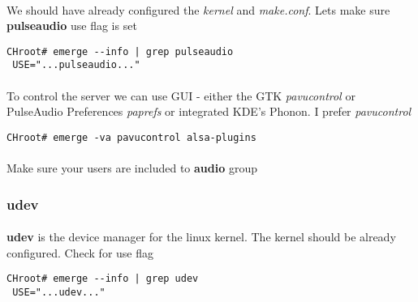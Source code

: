 \documentclass[10pt,a4paper]{article}
\begin{document}
                    \paragraph{} We should have already configured the \textit{kernel} and \textit{make.conf}. Lets make sure \textbf{pulseaudio} use flag is set
                    
                    \begin{lstlisting}[style=BashInputCHRoot]
 CHroot# emerge --info | grep pulseaudio
 USE="...pulseaudio..."
                    \end{lstlisting}
                    
                    \paragraph{} To control the server we can use GUI - either the GTK \textit{pavucontrol} or PulseAudio Preferences \textit{paprefs} or integrated KDE's Phonon. I prefer \textit{pavucontrol}
                    
                    \begin{lstlisting}[style=BashInputCHRoot]
 CHroot# emerge -va pavucontrol alsa-plugins             
                    \end{lstlisting}
                    
                    \paragraph{} Make sure your users are included to \textbf{audio} group
                    
                \newpage
                \subsubsection{udev}
                
                    \paragraph{} \textbf{udev} is the device manager for the linux kernel. The kernel should be already configured. Check for use flag
                    
                    \begin{lstlisting}[style=BashInputCHRoot]
 CHroot# emerge --info | grep udev
 USE="...udev..."
                    \end{lstlisting}
                    
\end{document}
